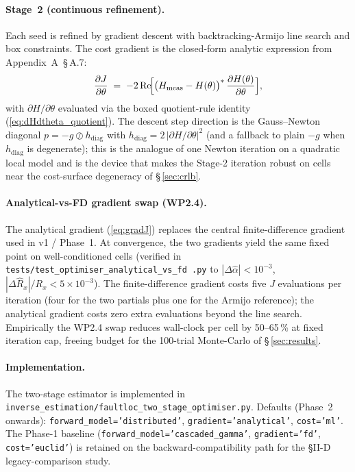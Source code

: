 \documentclass[journal]{IEEEtran}
\begin{document}
\paragraph{Stage~2 (continuous refinement).}
Each seed is refined by gradient descent with backtracking-Armijo
line search and box constraints.  The cost gradient is the
closed-form analytic expression from Appendix~A~\S\,A.7:
\begin{equation}
\frac{\partial J}{\partial \theta} \;=\;
   -2\,\mathrm{Re}\!\Bigl[
        \bigl(H_{\mathrm{meas}} - H(\theta)\bigr)^{*}\,
        \frac{\partial H(\theta)}{\partial \theta}
   \Bigr],
\label{eq:gradJ}
\end{equation}
with $\partial H/\partial\theta$ evaluated via the boxed quotient-rule
identity (\ref{eq:dHdtheta_quotient}).
The descent step direction is the Gauss--Newton diagonal
$p = -g \oslash h_{\mathrm{diag}}$ with $h_{\mathrm{diag}} =
2\,|\partial H/\partial \theta|^{2}$ (and a fallback to plain
$-g$ when $h_{\mathrm{diag}}$ is degenerate); this is the
analogue of one Newton iteration on a quadratic local model and
is the device that makes the Stage-2 iteration robust on cells
near the cost-surface degeneracy of \S\,\ref{sec:crlb}.

\paragraph{Analytical-vs-FD gradient swap (WP2.4).}
The analytical gradient (\ref{eq:gradJ}) replaces the central
finite-difference gradient used in v1 / Phase~1.  At convergence,
the two gradients yield the same fixed point on well-conditioned
cells (verified in \texttt{tests/test\_optimiser\_analytical\_vs\_fd
.py} to $|\Delta\hat\alpha| < 10^{-3}$,
$|\Delta\hat{R}_x|/R_x < 5\!\times\!10^{-3}$).  The finite-difference
gradient costs five $J$ evaluations per iteration (four for the two
partials plus one for the Armijo reference); the analytical gradient
costs zero extra evaluations beyond the line search.  Empirically the
WP2.4 swap reduces wall-clock per cell by 50--65\,\% at fixed
iteration cap, freeing budget for the 100-trial Monte-Carlo of
\S\,\ref{sec:results}.

\paragraph{Implementation.}
The two-stage estimator is implemented in
\texttt{inverse\_estimation/faultloc\_two\_stage\_optimiser.py}.
Defaults (Phase~2 onwards): \texttt{forward\_model='distributed'},
\texttt{gradient='analytical'}, \texttt{cost='ml'}.  The Phase-1
baseline (\texttt{forward\_model='cascaded\_gamma'},
\texttt{gradient='fd'}, \texttt{cost='euclid'}) is retained on the
backward-compatibility path for the §II-D legacy-comparison study.
\end{document}

